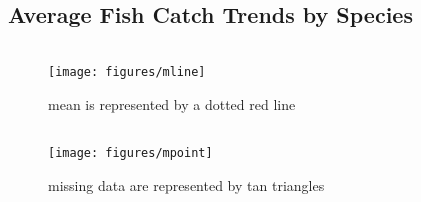 \documentclass[
]{book}
\begin{document}
\hypertarget{average-fish-catch-trends-by-species}{%
\subsection{Average Fish Catch Trends by Species}\label{average-fish-catch-trends-by-species}}

\begin{columns-nocenter}

\begin{column}

\begin{figure}
\texttt{[image: figures/mline]} \caption{mean is represented by a dotted red line}\label{fig:unnamed-chunk-119}
\end{figure}

\end{column}

\begin{column}

\begin{figure}
\texttt{[image: figures/mpoint]} \caption{missing data are represented by tan triangles}\label{fig:unnamed-chunk-120}
\end{figure}

\end{column}

\begin{column}

\end{column}

\end{columns-nocenter}
\end{document}
